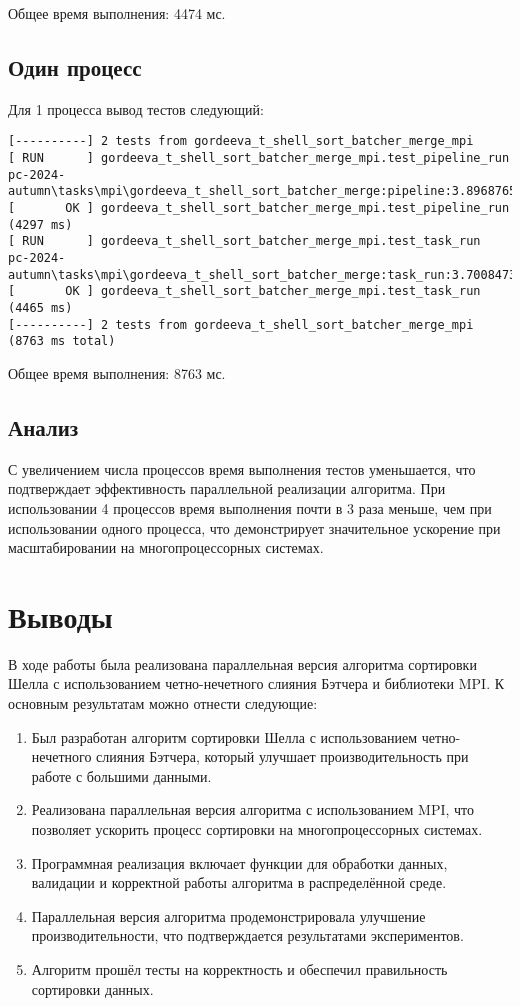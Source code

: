 \documentclass[a4paper,12pt]{article}
\begin{document}
Общее время выполнения: 4474 мс.

\subsection{Один процесс}
Для 1 процесса вывод тестов следующий:
\begin{verbatim}
[----------] 2 tests from gordeeva_t_shell_sort_batcher_merge_mpi
[ RUN      ] gordeeva_t_shell_sort_batcher_merge_mpi.test_pipeline_run
pc-2024-autumn\tasks\mpi\gordeeva_t_shell_sort_batcher_merge:pipeline:3.8968765000
[       OK ] gordeeva_t_shell_sort_batcher_merge_mpi.test_pipeline_run (4297 ms)
[ RUN      ] gordeeva_t_shell_sort_batcher_merge_mpi.test_task_run
pc-2024-autumn\tasks\mpi\gordeeva_t_shell_sort_batcher_merge:task_run:3.7008473000
[       OK ] gordeeva_t_shell_sort_batcher_merge_mpi.test_task_run (4465 ms)
[----------] 2 tests from gordeeva_t_shell_sort_batcher_merge_mpi (8763 ms total)
\end{verbatim}

Общее время выполнения: 8763 мс.

\subsection{Анализ}
С увеличением числа процессов время выполнения тестов уменьшается, что подтверждает эффективность параллельной реализации алгоритма. При использовании 4 процессов время выполнения почти в 3 раза меньше, чем при использовании одного процесса, что демонстрирует значительное ускорение при масштабировании на многопроцессорных системах.

\section{Выводы}
В ходе работы была реализована параллельная версия алгоритма сортировки Шелла с использованием четно-нечетного слияния Бэтчера и библиотеки MPI. К основным результатам можно отнести следующие:

\begin{enumerate}
  \item Был разработан алгоритм сортировки Шелла с использованием четно-нечетного слияния Бэтчера, который улучшает производительность при работе с большими данными.
  \item Реализована параллельная версия алгоритма с использованием MPI, что позволяет ускорить процесс сортировки на многопроцессорных системах.
  \item Программная реализация включает функции для обработки данных, валидации и корректной работы алгоритма в распределённой среде.
  \item Параллельная версия алгоритма продемонстрировала улучшение производительности, что подтверждается результатами экспериментов.
  \item Алгоритм прошёл тесты на корректность и обеспечил правильность сортировки данных.
\end{enumerate}
\end{document}
